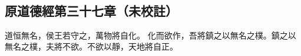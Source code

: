 ﻿%
%

\chapter{~}

\section{原道德經第三十七章（未校註）}

\begin{withgezhu}

\zhsong


\textcolor{tongjia-color}{道恒無名}，侯王若守之，萬物將自化。
\textcolor{tongjia-color}{化而欲作，吾將鎮之以無名之樸。鎮之以無名之樸，夫將不欲。不欲以靜，天地將自正。}

\end{withgezhu}
